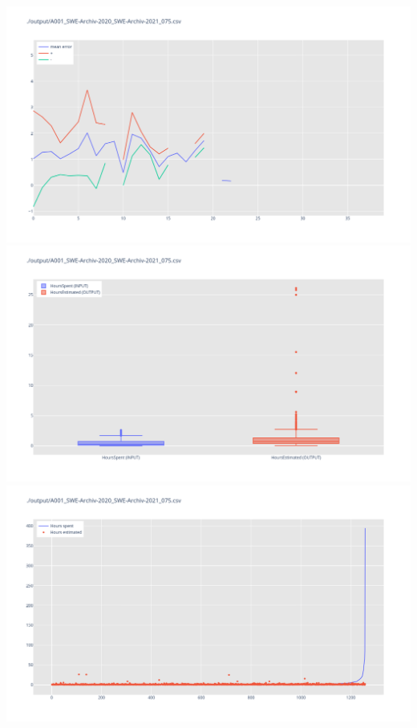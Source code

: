 \includegraphics[width=\textwidth]{Scripts/output/A001_SWE-Archiv-2020_SWE-Archiv-2021_075.csv.error_distribution.png}
\includegraphics[width=\textwidth]{Scripts/output/A001_SWE-Archiv-2020_SWE-Archiv-2021_075.csv.png}
\includegraphics[width=\textwidth]{Scripts/output/A001_SWE-Archiv-2020_SWE-Archiv-2021_075.csv.scatter.png}
